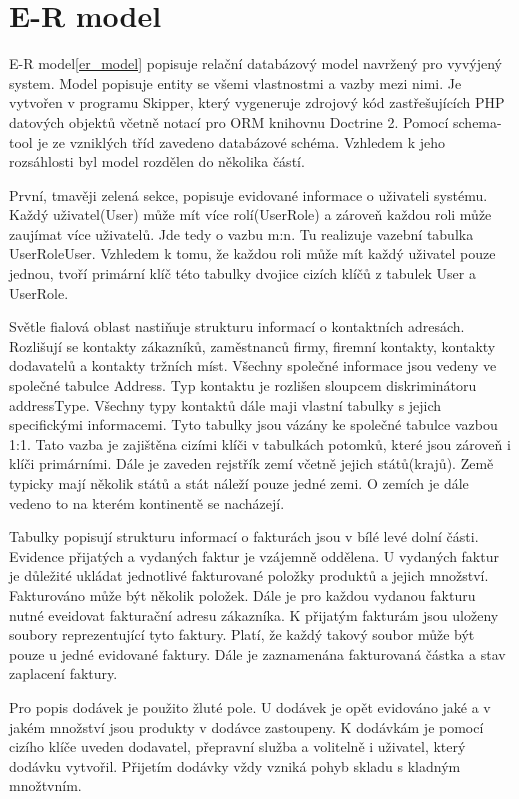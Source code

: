 \documentclass[thesis=B,czech]{FITthesis}[2012/06/26]
\begin{document}
\section{E-R model}
	E-R model\ref{er_model} popisuje relační databázový model navržený pro vyvýjený system. Model popisuje entity se všemi vlastnostmi a vazby mezi nimi. Je vytvořen v programu Skipper, který vygeneruje zdrojový kód zastřešujících PHP datových objektů včetně notací pro ORM knihovnu Doctrine 2. Pomocí schema-tool je ze vzniklých tříd zavedeno databázové schéma. Vzhledem k jeho rozsáhlosti byl model rozdělen do několika částí.
	
	První, tmavěji zelená sekce, popisuje evidované informace o uživateli systému. Každý uživatel(User) může mít více rolí(UserRole) a zároveň každou roli může zaujímat více uživatelů. Jde tedy o vazbu m:n. Tu realizuje vazební tabulka UserRoleUser. Vzhledem k tomu, že každou roli může mít každý uživatel pouze jednou, tvoří primární klíč této tabulky dvojice cizích klíčů z tabulek User a UserRole.
	
	Světle fialová oblast nastiňuje strukturu informací o kontaktních adresách. Rozlišují se kontakty zákazníků, zaměstnanců firmy, firemní kontakty, kontakty dodavatelů a kontakty tržních míst. Všechny společné informace jsou vedeny ve společné tabulce Address. Typ kontaktu je rozlišen sloupcem diskriminátoru addressType. Všechny typy kontaktů dále maji vlastní tabulky s jejich specifickými informacemi. Tyto tabulky jsou vázány ke společné tabulce vazbou 1:1. Tato vazba je zajištěna cizími klíči v tabulkách potomků, které jsou zároveň i klíči primárními. Dále je zaveden rejstřík zemí včetně jejich států(krajů). Země typicky mají několik států a stát náleží pouze jedné zemi. O zemích je dále vedeno to na kterém kontinentě se nacházejí.
	
	Tabulky popisují strukturu informací o fakturách jsou v bílé levé dolní části. Evidence přijatých a vydaných faktur je vzájemně oddělena. U vydaných faktur je důležité ukládat jednotlivé fakturované položky produktů a jejich množství. Fakturováno může být několik položek. Dále je pro každou vydanou fakturu nutné eveidovat fakturační adresu zákazníka. K přijatým fakturám jsou uloženy soubory reprezentující tyto faktury. Platí, že každý takový soubor může být pouze u jedné evidované faktury. Dále je zaznamenána fakturovaná částka a stav zaplacení faktury. 
	
	Pro popis dodávek je použito žluté pole. U dodávek je opět evidováno jaké a v jakém množství jsou produkty v dodávce zastoupeny. K dodávkám je pomocí cizího klíče uveden dodavatel, přepravní služba a volitelně i uživatel, který dodávku vytvořil. Přijetím dodávky vždy vzniká pohyb skladu s kladným množtvním.
	
\end{document}
